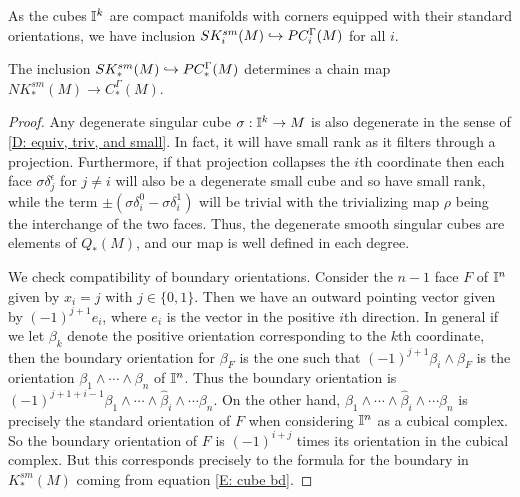 As the cubes $\mathbb{I}^k$ are compact manifolds with corners equipped with their standard orientations,
 we have inclusion $SK^{sm}_i(M)\hookrightarrow PC_i^\Gamma(M)$ for all $i$.


\begin{lemma}
The inclusion $SK^{sm}_*(M)\hookrightarrow PC_*^\Gamma(M)$ determines a chain map $NK^{sm}_*(M)\to C_*^\Gamma(M)$.
\end{lemma}
\begin{proof}
Any degenerate singular cube $\sigma:\mathbb{I}^k\to M$ is also degenerate in the sense of \cref{D: equiv, triv, and small}. In fact, it will have small rank as it filters through a projection. Furthermore, if that projection collapses the $i$th coordinate then each face $\sigma \delta_j^\epsilon$ for $j\neq i$ will also be a degenerate small cube and so have small rank, while the term $\pm (\sigma \delta_i^0-\sigma \delta_i^1)$ will be trivial with the trivializing map $\rho$ being the interchange of the two faces. Thus, the degenerate smooth singular cubes are elements of $Q_*(M)$, and our map is well defined in each degree.

We check compatibility of boundary orientations. Consider the $n-1$ face $F$ of $\mathbb{I}^n$ given by $x_i=j$ with $j\in\{0,1\}$. Then we have an outward pointing vector given by $(-1)^{j+1}e_i$, where $e_i$ is the vector in the positive $i$th direction. In general if we let $\beta_k$ denote the positive orientation corresponding to the $k$th coordinate, then the boundary orientation for $\beta_F$ is the one such that
$(-1)^{j+1}\beta_i\wedge\beta_F$ is the orientation $\beta_1\wedge\cdots\wedge \beta_n$ of $\mathbb{I}^n$. Thus the boundary orientation is $(-1)^{j+1+i-1}\beta_1\wedge \cdots\wedge \hat{\beta}_i\wedge \cdots\beta_n$. On the other hand, $\beta_1\wedge \cdots\wedge \hat{\beta}_i\wedge \cdots\beta_n$ is precisely the standard orientation of $F$ when considering $\mathbb{I}^n$ as a cubical complex. So the boundary orientation of $F$ is $(-1)^{i+j}$ times its orientation in the cubical complex. But this corresponds precisely to the formula for the boundary in $K^{sm}_*(M)$ coming from equation \eqref{E: cube bd}.
\end{proof}

